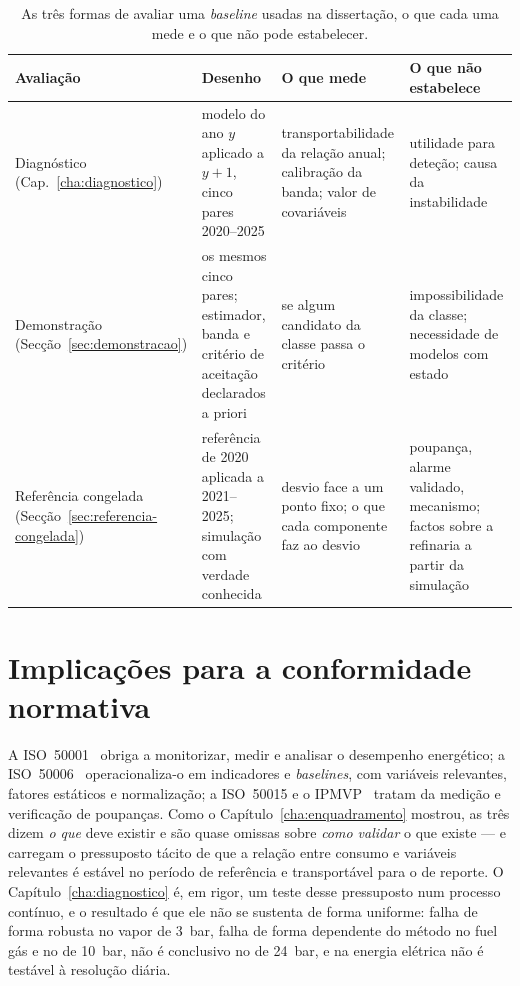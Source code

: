 \begin{table}[htbp]
  \centering
  \caption[Os três estimandos deste capítulo]{As três formas de avaliar uma
  \emph{baseline} usadas na dissertação, o que cada uma mede e o que não
  pode estabelecer.}
  \label{tab:estimandos}
  \small
  \begin{tabular}{p{3.0cm}p{3.6cm}p{3.6cm}p{3.4cm}}
    \toprule
    Avaliação & Desenho & O que mede & O que não estabelece \\
    \midrule
    Diagnóstico (Cap.~\ref{cha:diagnostico}) & modelo do ano $y$ aplicado a $y{+}1$, cinco pares 2020--2025 & transportabilidade da relação anual; calibração da banda; valor de covariáveis & utilidade para deteção; causa da instabilidade \\
    Demonstração (Secção~\ref{sec:demonstracao}) & os mesmos cinco pares; estimador, banda e critério de aceitação declarados a priori & se algum candidato da classe passa o critério & impossibilidade da classe; necessidade de modelos com estado \\
    Referência congelada (Secção~\ref{sec:referencia-congelada}) & referência de 2020 aplicada a 2021--2025; simulação com verdade conhecida & desvio face a um ponto fixo; o que cada componente faz ao desvio & poupança, alarme validado, mecanismo; factos sobre a refinaria a partir da simulação \\
    \bottomrule
  \end{tabular}
\end{table}

\section{Implicações para a conformidade normativa}
\label{sec:implicacoes-normativas}

A ISO~50001~\cite{ISO50001_2018} obriga a monitorizar, medir e analisar o
desempenho energético; a ISO~50006~\cite{ISO50006_2014} operacionaliza-o em
indicadores e \emph{baselines}, com variáveis relevantes, fatores estáticos
e normalização; a ISO~50015 e o IPMVP~\cite{ISO50015_2014,IPMVP_2022} tratam
da medição e verificação de poupanças. Como o Capítulo~\ref{cha:enquadramento}
mostrou, as três dizem \emph{o que} deve existir e são quase omissas sobre
\emph{como validar} o que existe --- e carregam o pressuposto tácito de que a
relação entre consumo e variáveis relevantes é estável no período de
referência e transportável para o de reporte. O Capítulo~\ref{cha:diagnostico}
é, em rigor, um teste desse pressuposto num processo contínuo, e o resultado
é que ele não se sustenta de forma uniforme: falha de forma robusta no vapor
de 3~bar, falha de forma dependente do método no fuel gás e no de 10~bar,
não é conclusivo no de 24~bar, e na energia elétrica não é testável à
resolução diária.


